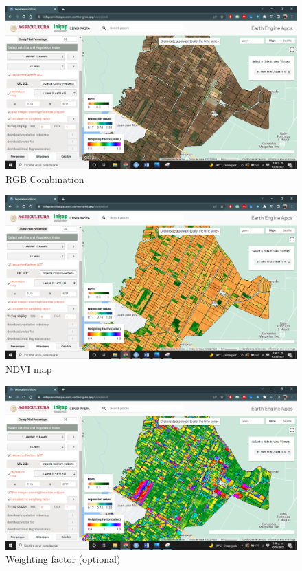 \documentclass[
]{book}
\begin{document}
\begin{figure}

{\centering \includegraphics[width=0.85\linewidth]{./images/Figure51} 

}

\caption{RGB Combination}\label{fig:figI1}
\end{figure}

\begin{figure}

{\centering \includegraphics[width=0.85\linewidth]{./images/Figure52} 

}

\caption{NDVI map}\label{fig:figI2}
\end{figure}

\begin{figure}

{\centering \includegraphics[width=0.85\linewidth]{./images/Figure53} 

}

\caption{Weighting factor (optional)}\label{fig:figI3}
\end{figure}
\end{document}
